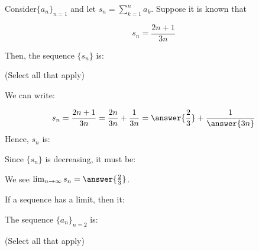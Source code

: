 \documentclass{ximera}
\author{Jim Talamo}
\begin{document}
\begin{exercise}
Consider$\{a_n \}_{n=1}$ and let $s_n = \sum_{k=1}^{n} a_k$.  Suppose it is known that

\[
s_n = \frac{2n+1}{3n}
\]

Then, the sequence $\{s_n\}$ is:

\begin{selectAll}
\end{selectAll}
(Select all that apply)

\begin{hint}
We can write:

\[
s_n = \frac{2n+1}{3n} = \frac{2n}{3n}+\frac{1}{3n} = \answer{\frac{2}{3}}+\frac{1}{\answer{3n}}
\]
Hence, $s_n$ is:

\begin{multipleChoice}
\end{multipleChoice}

\begin{question}
Since $\{s_n\}$ is decreasing, it must be:
\begin{multipleChoice}
\end{multipleChoice}

\begin{question}
We see $\lim_{n \to \infty} s_n = \answer{\frac{2}{3}}$.

If a sequence has a limit, then it:
\begin{multipleChoice}
\end{multipleChoice}

\end{question}
\end{question}

\end{hint}

The sequence $\{a_n \}_{n=2}$ is:
\begin{selectAll}
\end{selectAll}
(Select all that apply)


\end{exercise}
\end{document}
